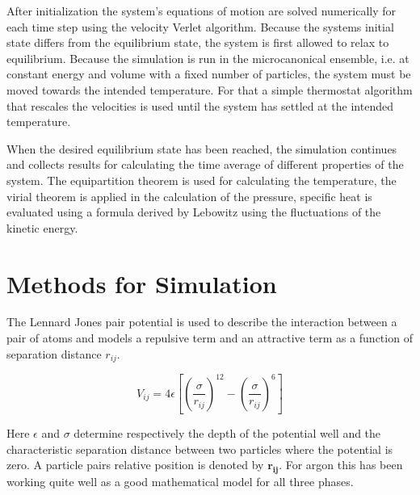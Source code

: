\documentclass[
10pt, %
a4paper, %
oneside, %
headinclude,footinclude, %
BCOR5mm, %
]{scrartcl}
\begin{document}
After initialization
the system's equations of motion are solved numerically for each time step using the velocity Verlet algorithm.  Because the systems initial state differs from the equilibrium state, the system is first allowed to relax to equilibrium. Because the simulation is run in the microcanonical ensemble, i.e. at constant energy and volume with a fixed number of particles, the system must be moved towards the intended temperature. For that a simple thermostat algorithm that rescales the velocities is used until the system has settled at the intended temperature. 

When the desired equilibrium state has been reached, the simulation continues and collects results for calculating the time average of different properties of the system. The equipartition theorem is used for calculating the temperature, the virial theorem is applied in the calculation of the pressure, specific heat is evaluated using a formula derived by Lebowitz using the fluctuations of the kinetic energy\cite{Duane:1985lz}.



 
\newpage



\section{Methods for Simulation}
The Lennard Jones pair potential is used to describe the interaction between a pair of atoms and models a repulsive term and an attractive term as a function of separation distance $r_{ij}$.

\begin{equation}
V_{ij} =  4 \epsilon \left [ \left (\frac{\sigma}{r_{ij}} \right )^{12} - \left ( \frac{\sigma}{r_{ij}} \right )^6 \right ]
\label{eq:lennard-jones}
\end{equation}

Here $\epsilon$ and $\sigma$ determine respectively the depth of the potential well and the characteristic separation distance between two particles where the potential is zero. A particle pairs relative position is denoted by $\mathbf{r_{ij}}$. For argon this has been working quite well as a good mathematical model for all three phases\cite{Rahman}.
\end{document}
